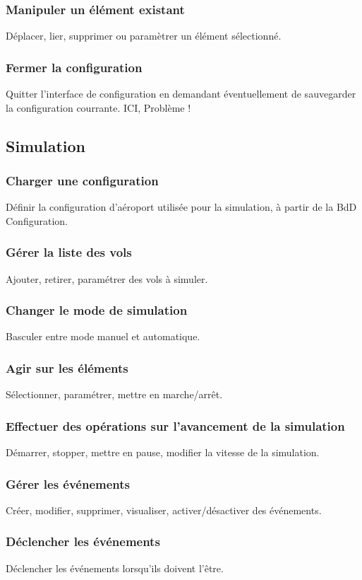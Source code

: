 \subsubsection{Manipuler un élément existant}
Déplacer, lier, supprimer ou paramètrer un élément sélectionné.

\subsubsection{Fermer la configuration}
Quitter l'interface de configuration en demandant éventuellement de sauvegarder la configuration courrante. {\huge ICI, Problème !}

\subsection{Simulation}
\subsubsection{Charger une configuration}
Définir la configuration d'aéroport utilisée pour la simulation, à partir de la BdD Configuration.
\subsubsection{Gérer la liste des vols}
Ajouter, retirer, paramétrer des vols à simuler.
\subsubsection{Changer le mode de simulation}
Basculer entre mode manuel et automatique.
\subsubsection{Agir sur les éléments}
Sélectionner, paramétrer, mettre en marche/arrêt.
\subsubsection{Effectuer des opérations sur l'avancement de la simulation}
Démarrer, stopper, mettre en pause, modifier la vitesse de la simulation.
\subsubsection{Gérer les événements}
Créer, modifier, supprimer, visualiser, activer/désactiver des événements.
\subsubsection{Déclencher les événements}
Déclencher les événements lorsqu'ils doivent l'être.
